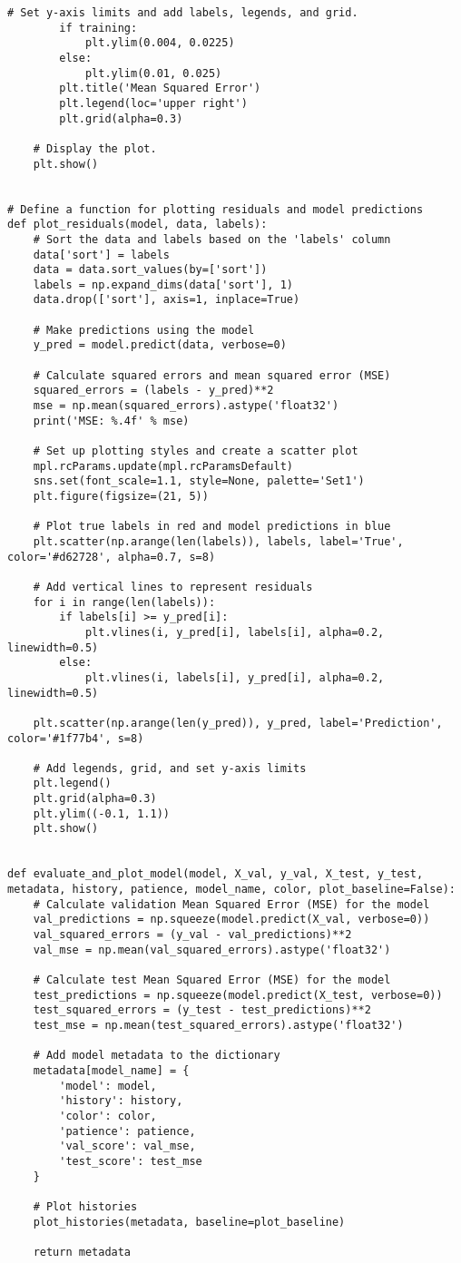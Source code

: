 \begin{lstlisting}[style=Python]
        # Set y-axis limits and add labels, legends, and grid.
        if training:
            plt.ylim(0.004, 0.0225)
        else:
            plt.ylim(0.01, 0.025)
        plt.title('Mean Squared Error')
        plt.legend(loc='upper right')
        plt.grid(alpha=0.3)

    # Display the plot.
    plt.show()


# Define a function for plotting residuals and model predictions
def plot_residuals(model, data, labels):
    # Sort the data and labels based on the 'labels' column
    data['sort'] = labels
    data = data.sort_values(by=['sort'])
    labels = np.expand_dims(data['sort'], 1)
    data.drop(['sort'], axis=1, inplace=True)

    # Make predictions using the model
    y_pred = model.predict(data, verbose=0)

    # Calculate squared errors and mean squared error (MSE)
    squared_errors = (labels - y_pred)**2
    mse = np.mean(squared_errors).astype('float32')
    print('MSE: %.4f' % mse)

    # Set up plotting styles and create a scatter plot
    mpl.rcParams.update(mpl.rcParamsDefault)
    sns.set(font_scale=1.1, style=None, palette='Set1')
    plt.figure(figsize=(21, 5))

    # Plot true labels in red and model predictions in blue
    plt.scatter(np.arange(len(labels)), labels, label='True', color='#d62728', alpha=0.7, s=8)

    # Add vertical lines to represent residuals
    for i in range(len(labels)):
        if labels[i] >= y_pred[i]:
            plt.vlines(i, y_pred[i], labels[i], alpha=0.2, linewidth=0.5)
        else:
            plt.vlines(i, labels[i], y_pred[i], alpha=0.2, linewidth=0.5)

    plt.scatter(np.arange(len(y_pred)), y_pred, label='Prediction', color='#1f77b4', s=8)

    # Add legends, grid, and set y-axis limits
    plt.legend()
    plt.grid(alpha=0.3)
    plt.ylim((-0.1, 1.1))
    plt.show()


def evaluate_and_plot_model(model, X_val, y_val, X_test, y_test, metadata, history, patience, model_name, color, plot_baseline=False):
    # Calculate validation Mean Squared Error (MSE) for the model
    val_predictions = np.squeeze(model.predict(X_val, verbose=0))
    val_squared_errors = (y_val - val_predictions)**2
    val_mse = np.mean(val_squared_errors).astype('float32')

    # Calculate test Mean Squared Error (MSE) for the model
    test_predictions = np.squeeze(model.predict(X_test, verbose=0))
    test_squared_errors = (y_test - test_predictions)**2
    test_mse = np.mean(test_squared_errors).astype('float32')

    # Add model metadata to the dictionary
    metadata[model_name] = {
        'model': model,
        'history': history,
        'color': color,
        'patience': patience,
        'val_score': val_mse,
        'test_score': test_mse
    }

    # Plot histories
    plot_histories(metadata, baseline=plot_baseline)

    return metadata
\end{lstlisting}